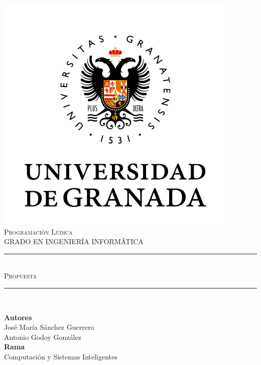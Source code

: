\documentclass[11pt,a4paper]{article}
\newcommand{\asignatura}{Programación Lúdica}
\newcommand{\autor}{José María Sánchez Guerrero}
\newcommand{\titulo}{Propuesta}
\begin{document}

\begin{titlepage}

\begin{minipage}{\textwidth}

\centering

\includegraphics[scale=0.5]{img/ugr.png}\\

\textsc{\Large \asignatura{}\\[0.2cm]}
\textsc{GRADO EN INGENIERÍA INFORMÁTICA}\\[1cm]

\noindent\rule[-1ex]{\textwidth}{1pt}\\[1.5ex]
\textsc{{\Huge \titulo\\[0.5ex]}}
\noindent\rule[-1ex]{\textwidth}{2pt}\\[3.5ex]

\end{minipage}

\vspace{0.5cm}

\begin{minipage}{\textwidth}

\centering

\textbf{Autores}\\ {\autor{}}\\{Antonio Godoy González}\\[2ex]
\textbf{Rama}\\ {Computación y Sistemas Inteligentes}\\[2.5ex]
\vspace{0.3cm}


\end{minipage}
\end{titlepage}
\end{document}
